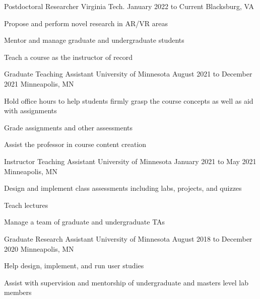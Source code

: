 
\begin{cventries}
  \cventry
    {Postdoctoral Researcher} %
    {Virginia Tech.} %
    {January 2022 to Current} %
    {Blacksburg, VA} %
    {
      \begin{cvitems} %
        \item {Propose and perform novel research in AR/VR areas}
        \item {Mentor and manage graduate and undergraduate students}
		\item {Teach a course as the instructor of record}
      \end{cvitems}
    }
    
  \cventry
    {Graduate Teaching Assistant} %
    {University of Minnesota} %
    {August 2021 to December 2021} %
    {Minneapolis, MN} %
    {
      \begin{cvitems} %
        \item {Hold office hours to help students firmly grasp the course concepts as well as aid with assignments}
        \item {Grade assignments and other assessments}
		\item {Assist the professor in course content creation}
      \end{cvitems}
    }
    
  \cventry
    {Instructor Teaching Assistant} %
    {University of Minnesota} %
    {January 2021 to May 2021} %
    {Minneapolis, MN} %
    {
      \begin{cvitems} %
        \item {Design and implement class assessments including labs, projects, and quizzes}
        \item {Teach lectures}
		\item {Manage a team of graduate and undergraduate TAs}
      \end{cvitems}
    }
    
  \cventry
    {Graduate Research Assistant} %
    {University of Minnesota} %
    {August 2018 to December 2020} %
    {Minneapolis, MN} %
    {
      \begin{cvitems} %
        \item {Help design, implement, and run user studies}
		\item {Assist with supervision and mentorship of undergraduate and masters level lab members}
      \end{cvitems}
    }
    

\end{cventries}
